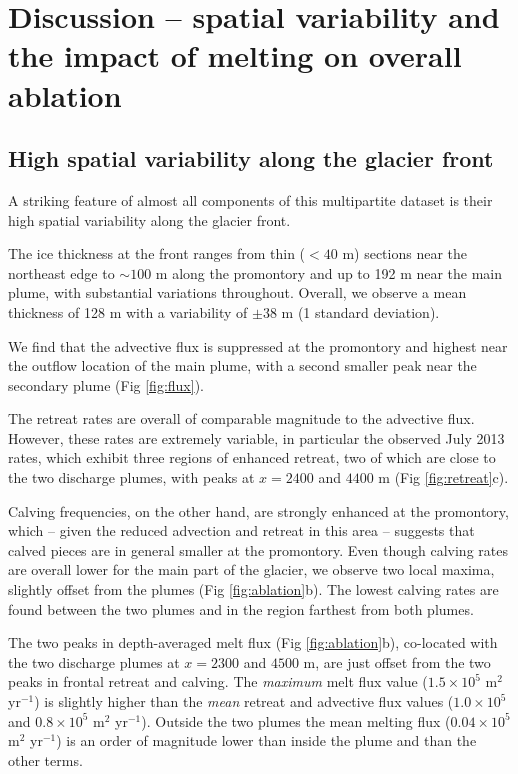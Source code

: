 \documentclass[10pt,letterpaper]{article}
\begin{document}
\section{Discussion -- spatial variability and the impact of melting on overall ablation}

\subsection{High spatial variability along the glacier front}

A striking feature of almost all components of this multipartite dataset is their high spatial variability along the glacier front. 

The ice thickness at the front ranges from thin ($<40$ m) sections near the northeast edge to $\sim 100$ m along the promontory and  up to 192 m near the main plume, with substantial variations throughout. Overall, we observe a mean thickness of 128 m with a variability  of $\pm 38$ m (1 standard deviation). 

We find that the advective flux is suppressed at the promontory and highest near the outflow location of the main plume, with a second smaller peak near the secondary plume (Fig \ref{fig:flux}). 

The retreat rates are overall of comparable magnitude to the advective flux. However, these rates are extremely variable, in particular the observed July 2013 rates, which exhibit three regions of enhanced retreat, two of which are close to the two discharge plumes, with peaks at $x = 2400$ and $4400$ m (Fig \ref{fig:retreat}c). 

Calving frequencies, on the other hand, are strongly enhanced at the promontory, which -- given the reduced advection and retreat in this area -- suggests that calved pieces are in general smaller at the promontory. Even though calving rates are overall lower for the main part of the glacier, we observe two local maxima, slightly offset from the plumes (Fig \ref{fig:ablation}b). The lowest calving rates are found between the two plumes and in the region farthest from both plumes. 

The two peaks in depth-averaged melt flux (Fig \ref{fig:ablation}b), co-located with the two discharge plumes at $x = 2300$ and $4500$ m, are just offset from the two peaks in frontal retreat and calving. The \textit{maximum} melt flux value ($1.5 \times 10^5$ m$^2$ yr$^{-1}$) is slightly higher than the \textit{mean} retreat and advective flux values ($1.0 \times 10^5$ and $0.8 \times 10^5$ m$^2$ yr$^{-1}$). Outside the two plumes the mean melting flux ($0.04 \times 10^5$ m$^2$ yr$^{-1}$) is an order of magnitude lower than inside the plume and than the other terms. 
\end{document}
